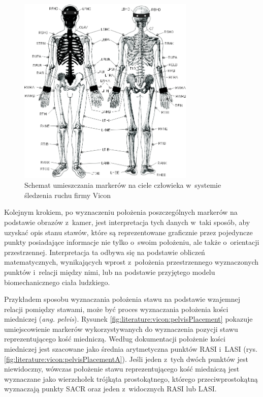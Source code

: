 \begin{savenotes}
	\begin{figure}[!htb]
		\centering	
		\includegraphics[width=0.75\textwidth]{images/markerPlacement.jpg}
		\caption[Schemat umieszczania markerów na ciele człowieka w~systemie śledzenia ruchu firmy Vicon]{Schemat umieszczania markerów na ciele człowieka w~systemie śledzenia ruchu firmy Vicon \cite{ViconGaitPlacement}}
		\label{fig:literature:vicon:markerPlacement}
	\end{figure}
\end{savenotes}
																			
Kolejnym krokiem, po wyznaczeniu położenia poszczególnych markerów na podstawie obrazów z~kamer, jest interpretacja tych danych w~taki sposób, aby uzyskać opis stanu stawów, które są reprezentowane graficznie przez pojedyncze punkty posiadające informacje nie tylko o~swoim położeniu, ale także o~orientacji przestrzennej. Interpretacja ta odbywa się na podstawie obliczeń matematycznych, wynikających wprost z~położenia przestrzennego wyznaczonych punktów i~relacji między nimi, lub na podstawie przyjętego modelu biomechanicznego ciała ludzkiego. 

Przykładem sposobu wyznaczania położenia stawu na podstawie wzajemnej relacji pomiędzy stawami, może być proces wyznaczania położenia kości miedniczej (\emph{ang. pelvis}). Rysunek \ref{fig:literature:vicon:pelvisPlacement} pokazuje umiejscowienie markerów wykorzystywanych do wyznaczenia pozycji stawu reprezentującego kość miedniczą. Według dokumentacji \cite{ViconModelingInstruction} położenie kości miedniczej jest szacowane jako średnia arytmetyczna punktów RASI i~LASI (rys. \ref{fig:literature:vicon:pelvisPlacementA}). Jeśli jeden z~tych dwóch punktów jest niewidoczny, wówczas położenie stawu reprezentującego kość miedniczą jest wyznaczane jako wierzchołek trójkąta prostokątnego, którego przeciwprostokątną wyznaczają punkty SACR oraz jeden z~widocznych RASI lub LASI.
																	
